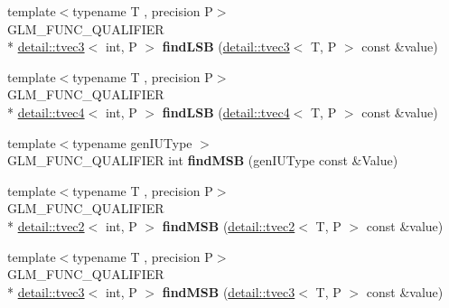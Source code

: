 \begin{DoxyCompactItemize}
\item 
\hypertarget{namespaceglm_a84e800d8d8e6526be81c6f5adcc275a8}{{\footnotesize template$<$typename T , precision P$>$ }\\G\-L\-M\-\_\-\-F\-U\-N\-C\-\_\-\-Q\-U\-A\-L\-I\-F\-I\-E\-R \\*
\hyperlink{structglm_1_1detail_1_1tvec3}{detail\-::tvec3}$<$ int, P $>$ {\bfseries find\-L\-S\-B} (\hyperlink{structglm_1_1detail_1_1tvec3}{detail\-::tvec3}$<$ T, P $>$ const \&value)}\label{namespaceglm_a84e800d8d8e6526be81c6f5adcc275a8}

\item 
\hypertarget{namespaceglm_a8e4e6525d3aa43da17a5c34b782b6b99}{{\footnotesize template$<$typename T , precision P$>$ }\\G\-L\-M\-\_\-\-F\-U\-N\-C\-\_\-\-Q\-U\-A\-L\-I\-F\-I\-E\-R \\*
\hyperlink{structglm_1_1detail_1_1tvec4}{detail\-::tvec4}$<$ int, P $>$ {\bfseries find\-L\-S\-B} (\hyperlink{structglm_1_1detail_1_1tvec4}{detail\-::tvec4}$<$ T, P $>$ const \&value)}\label{namespaceglm_a8e4e6525d3aa43da17a5c34b782b6b99}

\item 
\hypertarget{namespaceglm_adc22c75c7dd35bacf86237d8bfe8b53a}{{\footnotesize template$<$typename gen\-I\-U\-Type $>$ }\\G\-L\-M\-\_\-\-F\-U\-N\-C\-\_\-\-Q\-U\-A\-L\-I\-F\-I\-E\-R int {\bfseries find\-M\-S\-B} (gen\-I\-U\-Type const \&Value)}\label{namespaceglm_adc22c75c7dd35bacf86237d8bfe8b53a}

\item 
\hypertarget{namespaceglm_af4a84b6df7edb51f4b6a612021ef7999}{{\footnotesize template$<$typename T , precision P$>$ }\\G\-L\-M\-\_\-\-F\-U\-N\-C\-\_\-\-Q\-U\-A\-L\-I\-F\-I\-E\-R \\*
\hyperlink{structglm_1_1detail_1_1tvec2}{detail\-::tvec2}$<$ int, P $>$ {\bfseries find\-M\-S\-B} (\hyperlink{structglm_1_1detail_1_1tvec2}{detail\-::tvec2}$<$ T, P $>$ const \&value)}\label{namespaceglm_af4a84b6df7edb51f4b6a612021ef7999}

\item 
\hypertarget{namespaceglm_a9d435c4aca98a82adffb2a49a38d0019}{{\footnotesize template$<$typename T , precision P$>$ }\\G\-L\-M\-\_\-\-F\-U\-N\-C\-\_\-\-Q\-U\-A\-L\-I\-F\-I\-E\-R \\*
\hyperlink{structglm_1_1detail_1_1tvec3}{detail\-::tvec3}$<$ int, P $>$ {\bfseries find\-M\-S\-B} (\hyperlink{structglm_1_1detail_1_1tvec3}{detail\-::tvec3}$<$ T, P $>$ const \&value)}\label{namespaceglm_a9d435c4aca98a82adffb2a49a38d0019}


\end{DoxyCompactItemize}
